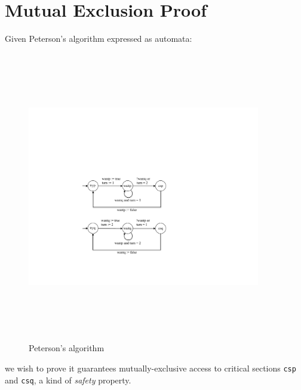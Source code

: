 \documentclass[12pt]{article}
\begin{document}
\section*{Mutual Exclusion Proof}

\noindent Given Peterson's algorithm expressed as automata:

\vspace{1em}
\begin{figure}[h]
\centering
\includegraphics[width=4.0in, height=5.0in,keepaspectratio=true]{peterson.pdf}
\caption{Peterson's algorithm}
\label{pa}
\end{figure}
\noindent we wish to prove it guarantees mutually-exclusive access to critical sections
{\tt csp} and {\tt csq}, a kind of {\em safety\/} property.
\end{document}
